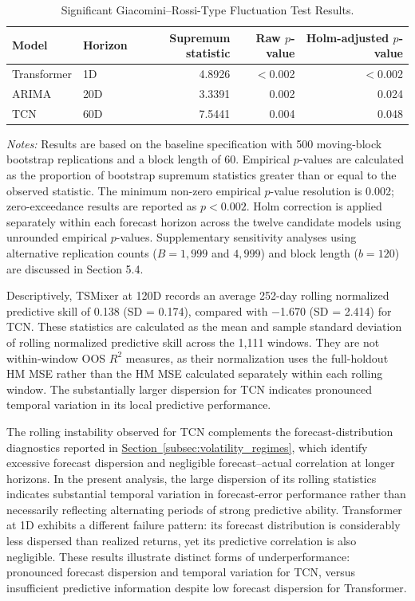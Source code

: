 \documentclass[runningheads,orivec]{llncs}
\begin{document}
\begin{table}[htbp]
\centering
\caption{Significant Giacomini--Rossi-Type Fluctuation Test Results.}\label{tab:h3_fluctuation_sig}
\setlength{\tabcolsep}{5pt}
\begin{tabular}{llrrr}
\hline
Model & Horizon & Supremum statistic & Raw $p$-value & Holm-adjusted $p$-value \\
\hline
Transformer & 1D  & 4.8926 & $<$0.002 & $<$0.002 \\
ARIMA       & 20D & 3.3391 & 0.002    & 0.024 \\
TCN         & 60D & 7.5441 & 0.004    & 0.048 \\
\hline
\end{tabular}
\par\vspace{4pt}\parbox{\linewidth}{\scriptsize\textit{Notes:} Results are based on the baseline specification with 500 moving-block bootstrap replications and a block length of 60. Empirical $p$-values are calculated as the proportion of bootstrap supremum statistics greater than or equal to the observed statistic. The minimum non-zero empirical $p$-value resolution is 0.002; zero-exceedance results are reported as $p<0.002$. Holm correction is applied separately within each forecast horizon across the twelve candidate models using unrounded empirical $p$-values. Supplementary sensitivity analyses using alternative replication counts ($B=1,999$ and $4,999$) and block length ($b=120$) are discussed in Section 5.4.}
\end{table}

Descriptively, TSMixer at 120D records an average 252-day rolling normalized predictive skill of 0.138 (SD = 0.174), compared with $-$1.670 (SD = 2.414) for TCN. These statistics are calculated as the mean and sample standard deviation of rolling normalized predictive skill across the 1,111 windows. They are not within-window OOS $R^2$ measures, as their normalization uses the full-holdout HM MSE rather than the HM MSE calculated separately within each rolling window. The substantially larger dispersion for TCN indicates pronounced temporal variation in its local predictive performance.

The rolling instability observed for TCN complements the forecast-distribution diagnostics reported in \hyperref[subsec:volatility_regimes]{Section~\ref*{subsec:volatility_regimes}}, which identify excessive forecast dispersion and negligible forecast--actual correlation at longer horizons. In the present analysis, the large dispersion of its rolling statistics indicates substantial temporal variation in forecast-error performance rather than necessarily reflecting alternating periods of strong predictive ability. Transformer at 1D exhibits a different failure pattern: its forecast distribution is considerably less dispersed than realized returns, yet its predictive correlation is also negligible. These results illustrate distinct forms of underperformance: pronounced forecast dispersion and temporal variation for TCN, versus insufficient predictive information despite low forecast dispersion for Transformer.
\end{document}
